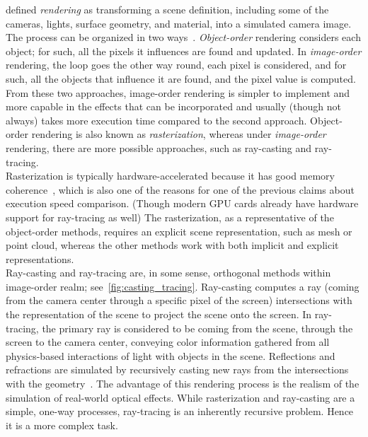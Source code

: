 \citet{SOTARendering} defined \emph{rendering} as transforming a scene definition, including some of the cameras,
lights, surface geometry, and material, into a simulated camera image. The process can be organized in two
ways~\citep{marschner2021fundamentals}. \emph{Object-order} rendering considers each object; for such,
all the pixels it influences are found and updated. In \emph{image-order} rendering, the loop
goes the other way round, each pixel is considered, and for such, all the objects that influence it are found, and
the pixel value is computed. From these two approaches, image-order rendering is simpler to implement and more capable in the
effects that can be incorporated and usually (though not always) takes more execution time compared to the second approach.
Object-order rendering is also known as \emph{rasterization}, whereas under
\emph{image-order} rendering, there are more possible approaches, such as ray-casting and ray-tracing.\\

Rasterization is typically hardware-accelerated because it has good memory coherence~\citep{SOTARendering}, which is also
one of the reasons for one of the previous claims about execution speed comparison. (Though modern GPU cards already have
hardware support for ray-tracing as well) The rasterization,
as a representative of the object-order methods, requires an explicit scene representation, such as mesh or point cloud, whereas the other
methods work with both implicit and explicit representations.\\

Ray-casting and ray-tracing are, in some sense, orthogonal methods within image-order realm; see~\cref{fig:casting_tracing}.
Ray-casting computes a ray (coming from the camera center
through a specific pixel of the screen) intersections with the representation of the scene to project the scene onto the screen.
In ray-tracing, the primary ray is considered to be coming from the scene, through the screen to the camera center, conveying
color information gathered from all physics-based interactions of light with objects in the scene. Reflections and refractions
are simulated by recursively casting new rays from the intersections with the geometry~\citep{Whitted1979AnII}. The advantage
of this rendering process is the realism of the simulation of real-world optical effects.
While rasterization and ray-casting are a simple, one-way
processes, ray-tracing is an inherently recursive problem. Hence it is a more complex task.

